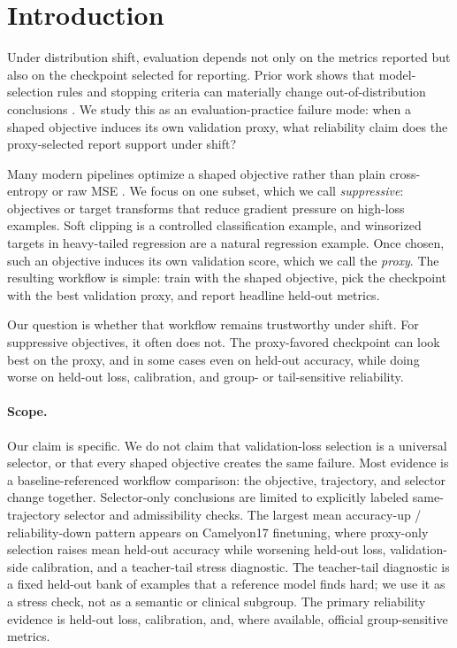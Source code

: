 \section{Introduction}
Under distribution shift, evaluation depends not only on the metrics reported but also on the checkpoint selected for reporting.
Prior work shows that model-selection rules and stopping criteria can materially change out-of-distribution conclusions \citep{gulrajani2020domainbed,cha2021swad,arpit2022ensembleaverages,yang2023changeishard,teterwak2025ermpp,naganuma2025pretrainedmodelselection,berta2025refinethencalibrate}.
We study this as an evaluation-practice failure mode: when a shaped objective induces its own validation proxy, what reliability claim does the proxy-selected report support under shift?

Many modern pipelines optimize a shaped objective rather than plain cross-entropy or raw MSE \citep{lin2017focalloss,reed2014bootstrapping,zhang2018generalizedcrossentropy}.
We focus on one subset, which we call \emph{suppressive}: objectives or target transforms that reduce gradient pressure on high-loss examples.
Soft clipping is a controlled classification example, and winsorized targets in heavy-tailed regression are a natural regression example.
Once chosen, such an objective induces its own validation score, which we call the \emph{proxy}.
The resulting workflow is simple: train with the shaped objective, pick the checkpoint with the best validation proxy, and report headline held-out metrics.

Our question is whether that workflow remains trustworthy under shift.
For suppressive objectives, it often does not.
The proxy-favored checkpoint can look best on the proxy, and in some cases even on held-out accuracy, while doing worse on held-out loss, calibration, and group- or tail-sensitive reliability.

\paragraph{Scope.}
Our claim is specific.
We do not claim that validation-loss selection is a universal selector, or that every shaped objective creates the same failure.
Most evidence is a baseline-referenced workflow comparison: the objective, trajectory, and selector change together.
Selector-only conclusions are limited to explicitly labeled same-trajectory selector and admissibility checks.
The largest mean accuracy-up / reliability-down pattern appears on Camelyon17 finetuning, where proxy-only selection raises mean held-out accuracy while worsening held-out loss, validation-side calibration, and a teacher-tail stress diagnostic.
The teacher-tail diagnostic is a fixed held-out bank of examples that a reference model finds hard; we use it as a stress check, not as a semantic or clinical subgroup.
The primary reliability evidence is held-out loss, calibration, and, where available, official group-sensitive metrics.

